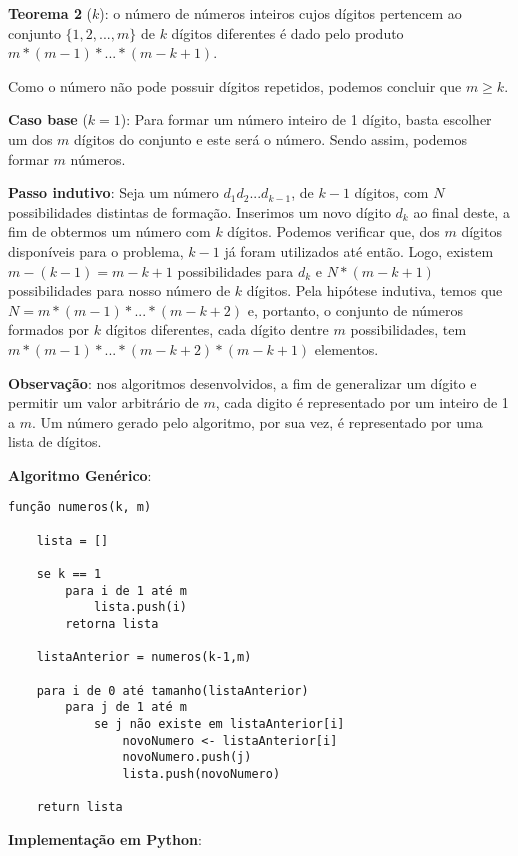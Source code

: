 \textbf{Teorema 2} ($k$): o número de números inteiros cujos dígitos pertencem ao conjunto $\{1,2,...,m\}$ de $k$ dígitos diferentes é dado pelo produto $m * (m-1) * ... * (m-k+1)$.

Como o número não pode possuir dígitos repetidos, podemos concluir que $m\geq k$.

\textbf{Caso base} ($k = 1$): Para formar um número inteiro de 1 dígito, basta escolher um dos $m$ dígitos do conjunto e este será o número. Sendo assim, podemos formar $m$ números.

\textbf{Passo indutivo}: Seja um número $d_1d_2...d_{k-1}$, de $k-1$ dígitos, com $N$ possibilidades distintas de formação. Inserimos um novo dígito $d_k$ ao final deste, a fim de obtermos um número com $k$ dígitos. Podemos verificar que, dos $m$ dígitos disponíveis para o problema, $k-1$ já foram utilizados até então. Logo, existem $m-(k-1) = m-k+1$ possibilidades para $d_k$ e $N*(m-k+1)$ possibilidades para nosso número de $k$ dígitos.
Pela hipótese indutiva, temos que $N = m * (m-1) * ... * (m-k+2)$ e, portanto, o conjunto de números formados por $k$ dígitos diferentes, cada dígito dentre $m$ possibilidades, tem $ m * (m-1) * ... * (m-k+2) * (m-k+1)$ elementos.

\textbf{Observação}: nos algoritmos desenvolvidos, a fim de generalizar um dígito e permitir um valor arbitrário de $m$, cada digito é representado por um inteiro de 1 a $m$. Um número gerado pelo algoritmo, por sua vez, é representado por uma lista de dígitos.

\textbf{Algoritmo Genérico}:

{\color{ogreen}
\begin{verbatim}
função numeros(k, m)

    lista = []

    se k == 1
        para i de 1 até m
            lista.push(i)
        retorna lista

    listaAnterior = numeros(k-1,m)

    para i de 0 até tamanho(listaAnterior)
        para j de 1 até m
            se j não existe em listaAnterior[i]
                novoNumero <- listaAnterior[i]
                novoNumero.push(j)
                lista.push(novoNumero)

    return lista
\end{verbatim}
}

\textbf{Implementação em Python}:

